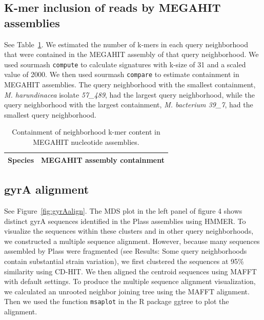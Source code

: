 \subsection{K-mer inclusion of reads by MEGAHIT assemblies}
\label{subsec:inclusion}

See Table~\ref{tab:kmer_inclusion}. We estimated the number of k-mers in each
query neighborhood that were contained in the MEGAHIT assembly of that query
neighborhood. We used sourmash {\tt compute} to calculate signatures with k-size of
31 and a scaled value of 2000. We then used sourmash {\tt compare} to estimate
containment in MEGAHIT assemblies. The query neighborhood with the smallest
containment, \emph{M. harundinacea} isolate \emph{57\_489}, had the largest query
neighborhood, while the query neighborhood with the largest containment,
\emph{M. bacterium 39\_7}, had the smallest query neighborhood.

\begin{table}
  \begin{tabular}{l c}
    \toprule
    Species & MEGAHIT assembly containment \\
    \midrule
    
%    
    \bottomrule
  \end{tabular}
  \caption{Containment of neighborhood k-mer content in MEGAHIT nucleotide assemblies.}
  \label{tab:kmer_inclusion}
\end{table}

\subsection{gyrA alignment}
\label{subsec:gyrAalign}

See Figure~\ref{fig:gyrAalign}. The MDS plot in the left panel of figure 4 shows
distinct gyrA sequences identified in the Plass assemblies using HMMER. To visualize
the sequences within these clusters and in other query neighborhoods, we
constructed a multiple sequence alignment. However, because many
sequences assembled by Plass were fragmented (see Results: Some query neighborhoods
contain substantial strain variation), we first clustered the sequences at 95\%
similarity using CD-HIT. We then aligned the centroid sequences using MAFFT with
default settings. To produce the multiple sequence alignment visualization, we
calculated an unrooted neighbor joining tree using the MAFFT alignment. Then we used
the function {\tt msaplot} in the R package ggtree to plot the alignment.

